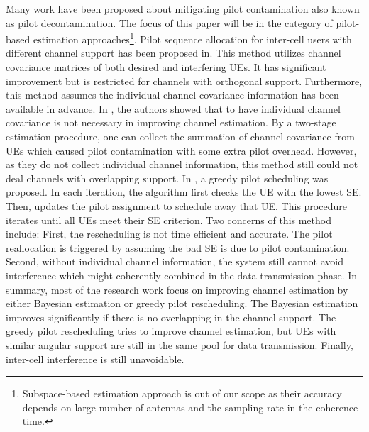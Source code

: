 Many work have been proposed about mitigating pilot contamination also known as pilot decontamination. The focus of this paper will be in the category of pilot-based estimation approaches\cite{elijah2016comprehensive}\footnote{Subspace-based estimation approach is out of our scope as their accuracy depends on large number of antennas and the sampling rate in the coherence time.}. Pilot sequence allocation for inter-cell users with different channel support has been proposed in\cite{yin2013coordinated,adhikary2013joint,you2015pilot}. This method utilizes channel covariance matrices of both desired and interfering UEs. It has significant improvement but is restricted for channels with orthogonal support. Furthermore, this method assumes the individual channel covariance information has been available in advance. In \cite{bjornson2016massive}, the authors showed that to have individual channel covariance is not necessary in improving channel estimation. By a two-stage estimation procedure, one can collect the summation of channel covariance from UEs which caused pilot contamination with some extra pilot overhead. However, as they do not collect individual channel information, this method still could not deal channels with overlapping support. In \cite{ngo2017cell}, a greedy pilot scheduling was proposed. In each iteration, the algorithm first checks the UE with the lowest SE. Then, updates the pilot assignment to schedule away that UE. This procedure iterates until all UEs meet their SE criterion. Two concerns of this method include: First, the rescheduling is not time efficient and accurate. The pilot reallocation is triggered by assuming the bad SE is due to pilot contamination. Second, without individual channel information, the system still cannot avoid interference which might coherently combined in the data transmission phase. In summary, most of the research work focus on improving channel estimation by either Bayesian estimation or greedy pilot rescheduling. The Bayesian estimation improves significantly if there is no overlapping in the channel support. The greedy pilot rescheduling tries to improve channel estimation, but UEs with similar angular support are still in the same pool for data transmission. Finally, inter-cell interference is still unavoidable.


